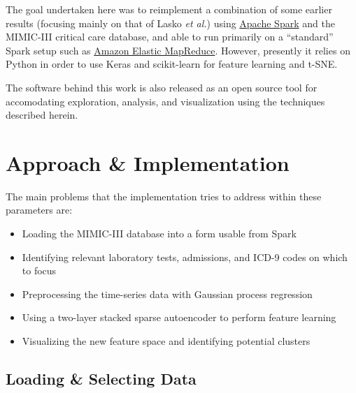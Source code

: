 \documentclass[journal]{IEEEtran}
\begin{document}
The goal undertaken here was to reimplement a combination of some
earlier results (focusing mainly on that of Lasko \emph{et
  al.}\cite{Lasko2013}) using \href{http://spark.apache.org/}{Apache
  Spark} and the MIMIC-III critical care database\cite{Johnson2016a},
and able to run primarily on a ``standard'' Spark setup such as
\href{https://aws.amazon.com/emr/}{Amazon Elastic MapReduce}.
However, presently it relies on Python in order to use Keras and
scikit-learn for feature learning and t-SNE.

The software behind this work is also released as an open source tool
for accomodating exploration, analysis, and visualization using the
techniques described herein.  %



\section{Approach \& Implementation}

The main problems that the implementation tries to address within
these parameters are:

\begin{itemize}
\item{Loading the MIMIC-III database into a form usable from Spark}
\item{Identifying relevant laboratory tests, admissions, and ICD-9
  codes on which to focus}
\item{Preprocessing the time-series data with Gaussian process
  regression}
\item{Using a two-layer stacked sparse autoencoder to perform feature
  learning}
\item{Visualizing the new feature space and identifying potential
  clusters}
\end{itemize}

\subsection{Loading \& Selecting Data}
\end{document}
